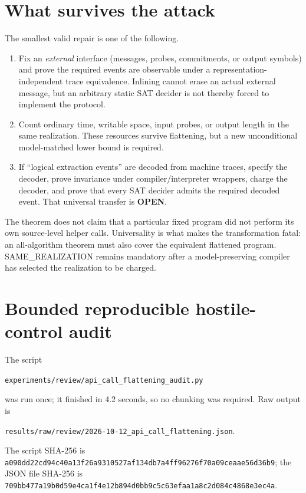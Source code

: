 \documentclass[11pt]{article}
\newcommand{\Open}{\textbf{OPEN}}
\begin{document}
\section{What survives the attack}
The smallest valid repair is one of the following.
\begin{enumerate}[leftmargin=1.5em]
\item Fix an \emph{external} interface (messages, probes, commitments, or output
symbols) and prove the required events are observable under a representation-
independent trace equivalence.  Inlining cannot erase an actual external
message, but an arbitrary static SAT decider is not thereby forced to implement
the protocol.
\item Count ordinary time, writable space, input probes, or output length in the
same realization.  These resources survive flattening, but a new unconditional
model-matched lower bound is required.
\item If ``logical extraction events'' are decoded from machine traces, specify
the decoder, prove invariance under compiler/interpreter wrappers, charge the
decoder, and prove that every SAT decider admits the required decoded event.
That universal transfer is \Open.
\end{enumerate}

The theorem does not claim that a particular fixed program did not perform its
own source-level helper calls.  Universality is what makes the transformation
fatal: an all-algorithm theorem must also cover the equivalent flattened
program.  SAME\_REALIZATION remains mandatory after a model-preserving compiler
has selected the realization to be charged.

\section{Bounded reproducible hostile-control audit}
The script
\begin{center}
\texttt{experiments/review/api\_call\_flattening\_audit.py}
\end{center}
was run once; it finished in 4.2 seconds, so no chunking was required.  Raw
output is
\begin{center}
\texttt{results/raw/review/2026-10-12\_api\_call\_flattening.json}.
\end{center}
The script SHA-256 is
\texttt{a090dd22cd94c40a13f26a9310527af134db7a4ff96276f70a09ceaae56d36b9};
the JSON file SHA-256 is
\texttt{709bb477a19b0d59e4ca1f4e12b894d0bb9c5c63efaa1a8c2d084c4868e3ec4a}.
\end{document}
